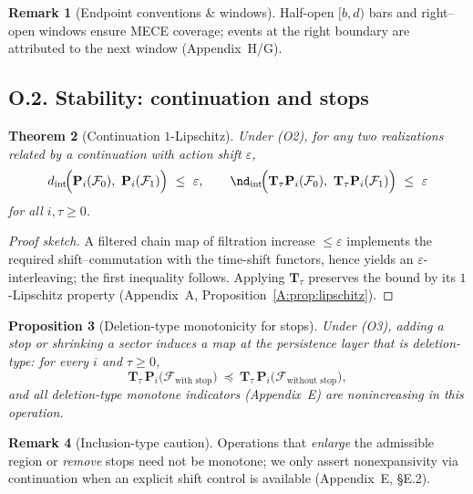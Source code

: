 \documentclass[11pt]{article}
\DeclareRobustCommand{\hyp}{\nobreakdash-}
\numberwithin{equation}{section}
\newtheorem{theorem}{Theorem}[section]
\newtheorem{proposition}[theorem]{Proposition}
\theoremstyle{definition}
\newtheorem{remark}[theorem]{Remark}
\begin{document}
\begin{remark}[Endpoint conventions \& windows]
Half-open \([b,d)\) bars and right–open windows ensure MECE coverage; events at the right boundary are attributed to the next window (Appendix~H/G).
\end{remark}

\subsection*{O.2. Stability: continuation and stops}
\begin{theorem}[Continuation \(1\)-Lipschitz]\label{O:thm:cont}
Under \textup{(O2)}, for any two realizations related by a continuation with action shift \(\varepsilon\),
\[
d_{\mathrm{int}}\!\Big(\mathbf{P}_i(\mathcal{F}_0),\ \mathbf{P}_i(\mathcal{F}_1)\Big)\ \le\ \varepsilon,\qquad\nd_{\mathrm{int}}\!\Big(\mathbf{T}_\tau\mathbf{P}_i(\mathcal{F}_0),\ \mathbf{T}_\tau\mathbf{P}_i(\mathcal{F}_1)\Big)\ \le\ \varepsilon
\]
for all \(i,\tau\ge 0\).
\end{theorem}

\begin{proof}[Proof sketch]
A filtered chain map of filtration increase \(\le\varepsilon\) implements the required shift–commutation with the time-shift functors, hence yields an \(\varepsilon\)-interleaving; the first inequality follows.
Applying \(\mathbf{T}_\tau\) preserves the bound by its \(1\)\hyp Lipschitz property (Appendix~A, Proposition~\ref{A:prop:lipschitz}).
\end{proof}

\begin{proposition}[Deletion-type monotonicity for stops]\label{O:prop:stops}
Under \textup{(O3)}, adding a stop or shrinking a sector induces a map at the persistence layer that is deletion-type:
for every \(i\) and \(\tau\ge 0\),
\[
\mathbf{T}_\tau\,\mathbf{P}_i\big(\mathcal{F}_{\text{with stop}}\big)\ \preceq\ \mathbf{T}_\tau\,\mathbf{P}_i\big(\mathcal{F}_{\text{without stop}}\big),
\]
and all deletion-type monotone indicators (Appendix~E) are nonincreasing in this operation.
\end{proposition}

\begin{remark}[Inclusion-type caution]
Operations that \emph{enlarge} the admissible region or \emph{remove} stops need not be monotone; we only assert nonexpansivity via continuation when an explicit shift control is available (Appendix~E, §E.2).
\end{remark}
\end{document}
